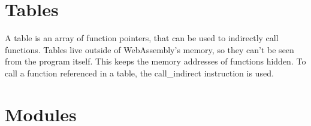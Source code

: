 \documentclass[10pt,a4paper]{article}
\begin{document}
\section*{Tables}

A table is an array of function pointers, that can be used to indirectly call functions. Tables live outside of WebAssembly's memory, so they can't be seen from the program itself. This keeps the memory addresses of functions hidden. To call a function referenced in a table, the \textsf{call\_indirect} instruction is used.

\section*{Modules}
\end{document}
